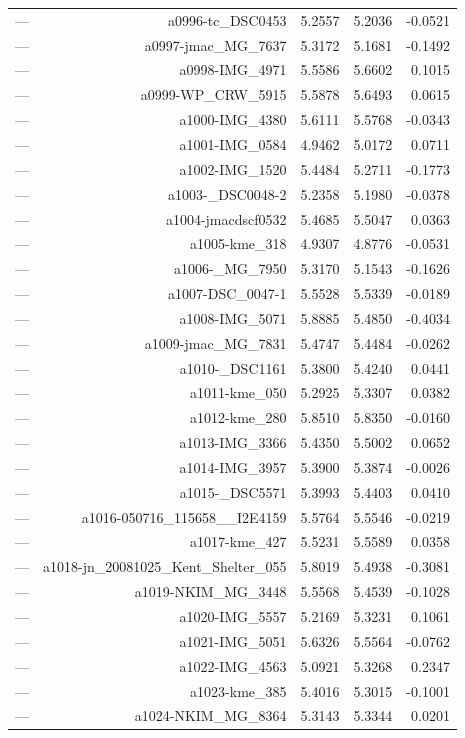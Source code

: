 \begin{table}[htbp]
\begin{tabular}{lrrrr}
— & a0996-tc_DSC0453 & 5.2557 & 5.2036 & -0.0521 \\
— & a0997-jmac_MG_7637 & 5.3172 & 5.1681 & -0.1492 \\
— & a0998-IMG_4971 & 5.5586 & 5.6602 & 0.1015 \\
— & a0999-WP_CRW_5915 & 5.5878 & 5.6493 & 0.0615 \\
— & a1000-IMG_4380 & 5.6111 & 5.5768 & -0.0343 \\
— & a1001-IMG_0584 & 4.9462 & 5.0172 & 0.0711 \\
— & a1002-IMG_1520 & 5.4484 & 5.2711 & -0.1773 \\
— & a1003-_DSC0048-2 & 5.2358 & 5.1980 & -0.0378 \\
— & a1004-jmacdscf0532 & 5.4685 & 5.5047 & 0.0363 \\
— & a1005-kme_318 & 4.9307 & 4.8776 & -0.0531 \\
— & a1006-_MG_7950 & 5.3170 & 5.1543 & -0.1626 \\
— & a1007-DSC_0047-1 & 5.5528 & 5.5339 & -0.0189 \\
— & a1008-IMG_5071 & 5.8885 & 5.4850 & -0.4034 \\
— & a1009-jmac_MG_7831 & 5.4747 & 5.4484 & -0.0262 \\
— & a1010-_DSC1161 & 5.3800 & 5.4240 & 0.0441 \\
— & a1011-kme_050 & 5.2925 & 5.3307 & 0.0382 \\
— & a1012-kme_280 & 5.8510 & 5.8350 & -0.0160 \\
— & a1013-IMG_3366 & 5.4350 & 5.5002 & 0.0652 \\
— & a1014-IMG_3957 & 5.3900 & 5.3874 & -0.0026 \\
— & a1015-_DSC5571 & 5.3993 & 5.4403 & 0.0410 \\
— & a1016-050716_115658__I2E4159 & 5.5764 & 5.5546 & -0.0219 \\
— & a1017-kme_427 & 5.5231 & 5.5589 & 0.0358 \\
— & a1018-jn_20081025_Kent_Shelter_055 & 5.8019 & 5.4938 & -0.3081 \\
— & a1019-NKIM_MG_3448 & 5.5568 & 5.4539 & -0.1028 \\
— & a1020-IMG_5557 & 5.2169 & 5.3231 & 0.1061 \\
— & a1021-IMG_5051 & 5.6326 & 5.5564 & -0.0762 \\
— & a1022-IMG_4563 & 5.0921 & 5.3268 & 0.2347 \\
— & a1023-kme_385 & 5.4016 & 5.3015 & -0.1001 \\
— & a1024-NKIM_MG_8364 & 5.3143 & 5.3344 & 0.0201 \\

\end{tabular}
\end{table}
